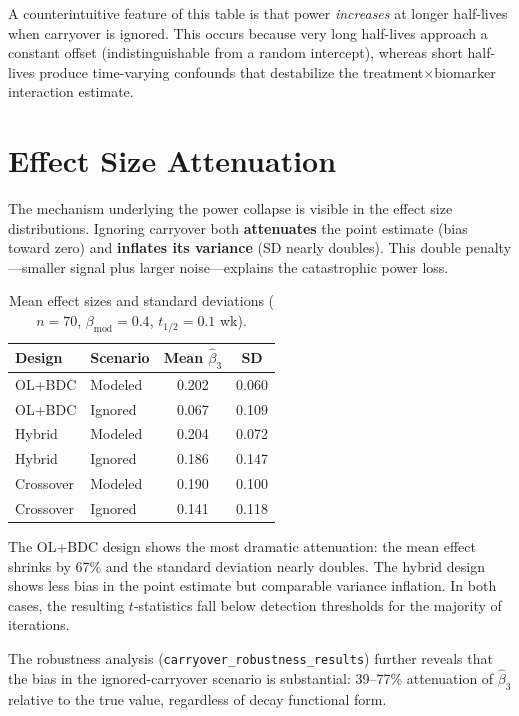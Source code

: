 \documentclass[11pt]{article}
\begin{document}
\noindent
A counterintuitive feature of this table is that power
\emph{increases} at longer half-lives when carryover is
ignored.
This occurs because very long half-lives approach a constant
offset (indistinguishable from a random intercept), whereas
short half-lives produce time-varying confounds that
destabilize the treatment$\times$biomarker interaction
estimate.

\section{Effect Size Attenuation}

The mechanism underlying the power collapse is visible
in the effect size distributions.
Ignoring carryover both \textbf{attenuates} the point
estimate (bias toward zero) and \textbf{inflates its
variance} (SD nearly doubles).
This double penalty---smaller signal plus larger
noise---explains the catastrophic power loss.

\begin{table}[ht]
\centering
\caption{Mean effect sizes and standard deviations
($n=70$, $\beta_{\mathrm{mod}}=0.4$, $t_{1/2}=0.1$ wk).}
\label{tab:effects}
\begin{tabular}{ll cc}
\toprule
Design & Scenario & Mean $\hat{\beta}_3$ & SD \\
\midrule
OL+BDC    & Modeled & 0.202 & 0.060 \\
OL+BDC    & Ignored & 0.067 & 0.109 \\
\addlinespace
Hybrid    & Modeled & 0.204 & 0.072 \\
Hybrid    & Ignored & 0.186 & 0.147 \\
\addlinespace
Crossover & Modeled & 0.190 & 0.100 \\
Crossover & Ignored & 0.141 & 0.118 \\
\bottomrule
\end{tabular}
\end{table}

\noindent
The OL+BDC design shows the most dramatic attenuation:
the mean effect shrinks by 67\% and the standard deviation
nearly doubles.
The hybrid design shows less bias in the point estimate
but comparable variance inflation.
In both cases, the resulting $t$-statistics fall below
detection thresholds for the majority of iterations.

The robustness analysis
(\texttt{carryover\_robustness\_results})
further reveals that the bias in the ignored-carryover
scenario is substantial: 39--77\% attenuation of
$\hat{\beta}_3$ relative to the true value, regardless
of decay functional form.
\end{document}
